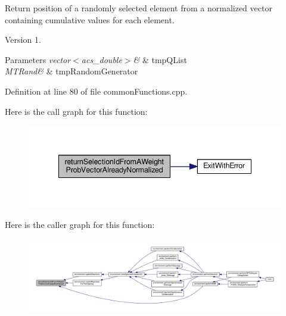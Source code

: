 Return position of a randomly selected element from a normalized vector containing cumulative values for each element. 

\begin{DoxyVersion}{Version}
1. 
\end{DoxyVersion}

\begin{DoxyParams}{Parameters}
{\em vector$<$acs\-\_\-double$>$\&} & tmp\-Q\-List \\
\hline
{\em M\-T\-Rand\&} & tmp\-Random\-Generator \\
\hline
\end{DoxyParams}


Definition at line 80 of file common\-Functions.\-cpp.



Here is the call graph for this function\-:\nopagebreak
\begin{figure}[H]
\begin{center}
\leavevmode
\includegraphics[width=338pt]{a00028_a4135ff15fd24eb8fbfee3d00e1cfbf20_cgraph}
\end{center}
\end{figure}




Here is the caller graph for this function\-:\nopagebreak
\begin{figure}[H]
\begin{center}
\leavevmode
\includegraphics[width=350pt]{a00028_a4135ff15fd24eb8fbfee3d00e1cfbf20_icgraph}
\end{center}
\end{figure}


